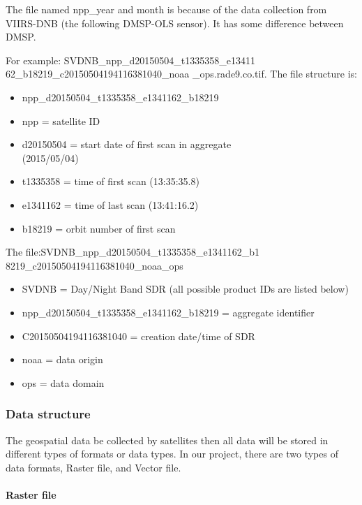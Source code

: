 \documentclass[conference]{IEEEtran}
\begin{document}
The file named npp\_year and month is because of the data collection from VIIRS-DNB (the following DMSP-OLS sensor). 
It has some difference between DMSP.

For example: SVDNB\_npp\_d20150504\_t1335358\_e13411
62\_b18219\_c20150504194116381040\_noaa
\_ops.rade9.co.tif. The file structure is:

\begin{itemize}
    \item npp\_d20150504\_t1335358\_e1341162\_b18219
    \item npp = satellite ID
    \item d20150504 = start date of first scan in aggregate \\
    (2015/05/04)
    \item t1335358 = time of first scan (13:35:35.8)
    \item e1341162 = time of last scan (13:41:16.2)
    \item b18219 = orbit number of first scan
\end{itemize} 

The file:SVDNB\_npp\_d20150504\_t1335358\_e1341162\_b1\\
8219\_c20150504194116381040\_noaa\_ops

\begin{itemize}
    \item SVDNB = Day/Night Band SDR (all possible product IDs are listed below)
    \item npp\_d20150504\_t1335358\_e1341162\_b18219 = aggregate identifier
    \item C20150504194116381040 = creation date/time of SDR
    \item noaa = data origin
    \item ops = data domain
\end{itemize}

\subsubsection{Data structure}

The geospatial data be collected by satellites then all data will be stored in different types of formats or data types. 
In our project, there are two types of data formats, Raster file, and Vector file.

\paragraph{Raster file} 
\end{document}
